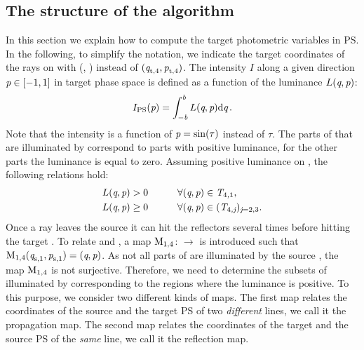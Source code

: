 \subsection{The structure of the algorithm}
In this section we explain how to compute the target photometric variables in PS.
In the following, to simplify the notation, we indicate the target coordinates of the rays on  with (, ) instead of $(\textit{q}_{\textrm{t,} \textit{$4$}}, \textit{p}_{\textrm{t,} \textit{$4$}})$.
The intensity $I$ along a given direction $\textit{p}\in [-1,1]$ in target phase space  is defined as a function of the luminance $L(\textit{q}, \textit{p})$:
\begin{equation}\label{I(eta)}
I_{\textrm{PS}}(\textit{p}) = \int_{-\textit{b}}^{\textit{b}} L(\textit{q},\textit{p}) \textrm{d}\textit{q}\,.
\end{equation}
Note that the intensity is a function of $\textit{p}= \sin(\tau)$ instead of $\tau$.
The parts of  that are illuminated by  correspond to parts with positive luminance, for the other parts the luminance is equal to zero.
Assuming positive luminance on , the following relations hold:
\begin{subequations}\label{LT4}
\begin{align}
L(\textit{q}, \textit{p})&>0 \qquad \quad \forall (\textit{q}, \textit{p})\in \mbox{$\emph{T}_{\textit{$4$,$1$}}$},\\
L(\textit{q}, \textit{p})&\geq 0 \qquad\quad \forall(\textit{q}, \textit{p}) \in (\mbox{$\emph{T}_{\textit{$4$,\textit{j}}}$})_{\textit{j}=2,3}.\label{third}
\end{align}
\end{subequations}
Once a ray leaves the source  it can hit the reflectors several times before hitting the target . To relate  and , a map $\mathrm{M}_{1,4}$: $\rightarrow$  is introduced such that $\mathrm{M}_{1,4}(\textit{q}_{\textrm{s,} \textit{$1$}},\textit{p}_{\textrm{s,} \textit{$1$}})=(\textit{q},\textit{p})$. As  not all parts of  are illuminated by the source , the map
$\mathrm{M}_{1,4}$ is not surjective.
Therefore, we need to determine the subsets of  illuminated by  corresponding to the regions where the luminance is positive.
To this purpose, we consider two different kinds of maps.
The first map relates the coordinates of the source and the target PS of two \textit{different} lines, we call it the propagation map.
The second map relates the coordinates of the target and the source PS of the \textit{same} line, we call it the reflection map.
